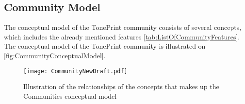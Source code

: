\subsection{Community Model}
\label{CommunityModel}
The conceptual model of the TonePrint community consists of several concepts, which includes the already mentioned features \autoref{tab:ListOfCommunityFeatures}. The conceptual model of the TonePrint community is illustrated on \autoref{fig:CommunityConceptualModel}.\\

\begin{figure}[H]
	\centering
	\texttt{[image: CommunityNewDraft.pdf]}
	\caption{Illustration of the relationships of the concepts that makes up the Communities conceptual model}
	\label{fig:CommunityConceptualModel}
\end{figure}

